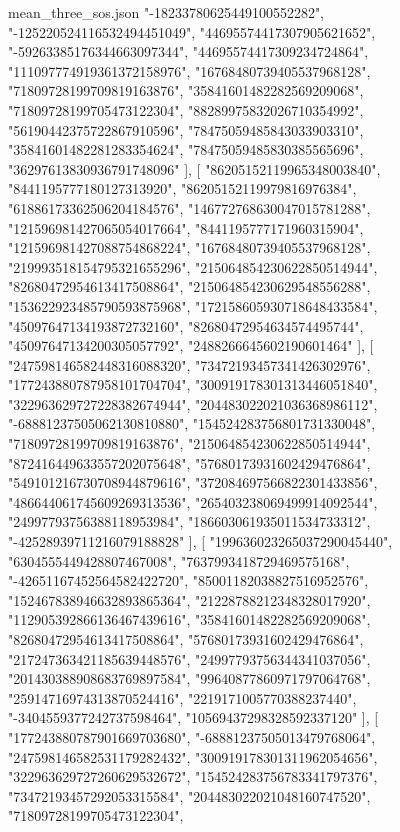 \begin{filecontents*}[overwrite]{mean_three_sos.json}
    "-18233780625449100552282",
    "-125220524116532494451049",
    "44695574417307905621652",
    "-59263385176344663097344",
    "44695574417309234724864",
    "111097774919361372158976",
    "16768480739405537968128",
    "71809728199709819163876",
    "35841601482282569209068",
    "71809728199705473122304",
    "88289975832026710354992",
    "56190442375722867910596",
    "78475059485843033903310",
    "35841601482281283354624",
    "78475059485830385565696",
    "36297613830936791748096"
   ],
   [
    "86205152119965348003840",
    "8441195777180127313920",
    "86205152119979816976384",
    "61886173362506204184576",
    "146772768630047015781288",
    "121596981427065054017664",
    "8441195777171960315904",
    "121596981427088754868224",
    "16768480739405537968128",
    "219993518154795321655296",
    "215064854230622850514944",
    "82680472954613417508864",
    "215064854230629548556288",
    "153622923485790593875968",
    "172158605930718648433584",
    "45097647134193872732160",
    "82680472954634574495744",
    "45097647134200305057792",
    "2488266645602190601464"
   ],
   [
    "247598146582448316088320",
    "73472193457341426302976",
    "177243880787958101704704",
    "300919178301313446051840",
    "322963629727228382674944",
    "204483022021036368986112",
    "-68881237505062130810880",
    "154524283756801731330048",
    "71809728199709819163876",
    "215064854230622850514944",
    "872416449633557202075648",
    "57680173931602429476864",
    "549101216730708944879616",
    "372084697566822301433856",
    "486644061745609269313536",
    "265403238069499914092544",
    "24997793756388118953984",
    "186603061935011534733312",
    "-42528939711216079188828"
   ],
   [
    "199636023265037290045440",
    "6304555449428807467008",
    "7637993418729469575168",
    "-42651167452564582422720",
    "85001182038827516952576",
    "152467838946632893865364",
    "21228788212348328017920",
    "112905392866136467439616",
    "35841601482282569209068",
    "82680472954613417508864",
    "57680173931602429476864",
    "217247363421185639448576",
    "24997793756344341037056",
    "201430388908683769897584",
    "99640877860971797064768",
    "25914716974313870524416",
    "2219171005770388237440",
    "-3404559377242737598464",
    "10569437298328592337120"
   ],
   [
    "177243880787901669703680",
    "-68881237505013479768064",
    "247598146582531179282432",
    "300919178301311962054656",
    "322963629727260629532672",
    "154524283756783341797376",
    "73472193457292053315584",
    "204483022021048160747520",
    "71809728199705473122304",

\end{filecontents*}
